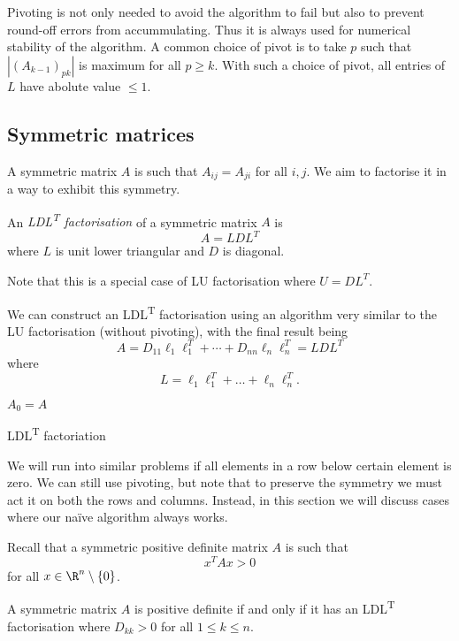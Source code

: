 \documentclass[a4paper]{article}
\begin{document}
Pivoting is not only needed to avoid the algorithm to fail but also to prevent round-off errors from accummulating. Thus it is always used for numerical stability of the algorithm. A common choice of pivot is to take \(p\) such that \(|(A_{k - 1})_{pk}|\) is maximum for all \(p \geq k\). With such a choice of pivot, all entries of \(L\) have abolute value \(\leq 1\).

\subsection{Symmetric matrices}

A symmetric matrix \(A\) is such that \(A_{ij} = A_{ji}\) for all \(i, j\). We aim to factorise it in a way to exhibit this symmetry. 

\begin{definition}
  An \emph{LDL\textsuperscript{T} factorisation} of a symmetric matrix \(A\) is
  \[
    A = LDL^T
  \]
  where \(L\) is unit lower triangular and \(D\) is diagonal.
\end{definition}

Note that this is a special case of LU factorisation where \(U = DL^T\).

We can construct an LDL\textsuperscript{T} factorisation using an algorithm very similar to the LU factorisation (without pivoting), with the final result being
\[
  A = D_{11}\ell_1\ell_1^T + \cdots + D_{nn}\ell_n\ell_n^T = LDL^T
\]
where
\[
  L = \ell_1\ell_1^T + \dots + \ell_n\ell_n^T.
\]

\begin{algorithm}
  \(A_0 = A\)\;
  \caption{LDL\textsuperscript{T} factoriation}
\end{algorithm}

We will run into similar problems if all elements in a row below certain element is zero. We can still use pivoting, but note that to preserve the symmetry we must act it on both the rows and columns. Instead, in this section we will discuss cases where our naïve algorithm always works.

Recall that a symmetric positive definite matrix \(A\) is such that
\[
  x^TAx > 0
\]
for all \(x \in \R^n \setminus \{0\}\).

\begin{theorem}
  A symmetric matrix \(A\) is positive definite if and only if it has an LDL\textsuperscript{T} factorisation where \(D_{kk} > 0\) for all \(1 \leq k \leq n\).
\end{theorem}
\end{document}

